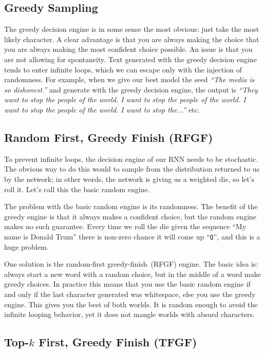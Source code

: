 \documentclass{article}
\begin{document}
\subsection{Greedy Sampling}\label{sec:greedySampling}

The greedy decision engine is in some sense the most obvious: just take the most likely character. A clear advantage is that you are always making the choice that you are always making the most confident choice possible. An issue is that you are not allowing for spontaneity. Text generated with the greedy decision engine tends to enter infinite loops, which we can escape only with the injection of randomness. For example, when we give our best model the seed \textit{``The media is so dishonest.''} and generate with the greedy decision engine, the output is \textit{``They want to stop the people of the world. I want to stop the people of the world. I want to stop the people of the world. I want to stop the...''} etc.

\subsection{Random First, Greedy Finish (RFGF)}

To prevent infinite loops, the decision engine of our RNN needs to be stochastic. The obvious way to do this would to sample from the distribution returned to us by the network; in other words, the network is giving us a weighted die, so let's roll it. Let's call this the basic random engine.

The problem with the basic random engine is its randomness. The benefit of the greedy engine is that it always makes a confident choice, but the random engine makes no such guarantee. Every time we roll the die given the sequence ``My name is Donald Trum'' there is non-zero chance it will come up ``\texttt{Q}'', and this is a huge problem.

One solution is the random-first greedy-finish~(RFGF) engine. The basic idea is: always start a new word with a random choice, but in the middle of a word make greedy choices. In practice this means that you use the basic random engine if and only if the last character generated was whitespace, else you use the greedy engine. This gives you the best of both worlds. It is random enough to avoid the infinite looping behavior, yet it does not mangle worlds with absurd characters.

\subsection{Top-$\mathbf{\textit{k}}$ First, Greedy Finish (TFGF)}
\end{document}
